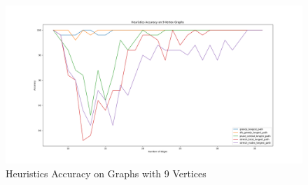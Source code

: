 \documentclass[twocolumn,showpacs,%
  nofootinbib,aps,superscriptaddress,%
  eqsecnum,prd,notitlepage,showkeys,11pt]{article}
\begin{document}
\begin{figure}[htp]
    \centering
    \includegraphics[width=\linewidth]{Accuracy9VertexAll.png}
    \caption{Heuristics Accuracy on Graphs with 9 Vertices}
    \label{fig:ExampleGraph}
\end{figure}
\end{document}
